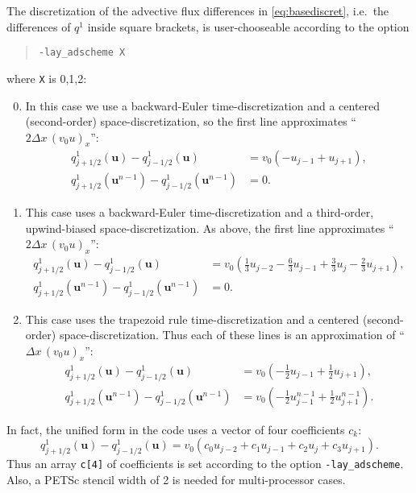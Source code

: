 \documentclass[11pt]{amsart}
\newcommand\bu{\mathbf{u}}
\begin{document}
The discretization of the advective flux differences in \eqref{eq:basediscret}, i.e.~the differences of $q^1$ inside square brackets, is user-chooseable according to the option
\begin{quote}
\verb|-lay_adscheme X|
\end{quote}
where \verb|X| is 0,1,2:
\medskip
\renewcommand{\labelenumi}{\texttt{X}$=$\arabic{enumi}: \quad}
\begin{enumerate}
\setcounter{enumi}{-1}
\item %
In this case we use a backward-Euler time-discretization and a centered (second-order) space-discretization, so the first line approximates ``$2 \Delta x\,(v_0 u)_x$'':
\begin{align*}
q^1_{j+1/2}(\bu) - q^1_{j-1/2}(\bu)             &= v_0 \left( - u_{j-1} + u_{j+1} \right), \\
q^1_{j+1/2}(\bu^{n-1}) - q^1_{j-1/2}(\bu^{n-1}) &= 0.
\end{align*}
\item %
This case uses a backward-Euler time-discretization and a third-order, upwind-biased space-discretization.  As above, the first line approximates ``$2 \Delta x\,(v_0 u)_x$'':
\begin{align*}
q^1_{j+1/2}(\bu) - q^1_{j-1/2}(\bu)             &= v_0 \left( \tfrac{1}{3} u_{j-2} - \tfrac{6}{3} u_{j-1} + \tfrac{3}{3} u_j - \tfrac{2}{3} u_{j+1} \right), \\
q^1_{j+1/2}(\bu^{n-1}) - q^1_{j-1/2}(\bu^{n-1}) &= 0.
\end{align*}
\item %
This case uses the trapezoid rule time-discretization and a centered (second-order) space-discretization.  Thus each of these lines is an approximation of ``$\Delta x\,(v_0 u)_x$'':
\begin{align*}
q^1_{j+1/2}(\bu) - q^1_{j-1/2}(\bu)             &= v_0 \left( - \tfrac{1}{2} u_{j-1} + \tfrac{1}{2} u_{j+1} \right), \\
q^1_{j+1/2}(\bu^{n-1}) - q^1_{j-1/2}(\bu^{n-1}) &= v_0 \left( - \tfrac{1}{2} u_{j-1}^{n-1} + \tfrac{1}{2} u_{j+1}^{n-1} \right).
\end{align*}
\end{enumerate}

\medskip
In fact, the unified form in the code uses a vector of four coefficients $c_k$:
\begin{equation}
   q^1_{j+1/2}(\bu) - q^1_{j-1/2}(\bu) = v_0 \left( c_0 u_{j-2} + c_1 u_{j-1} + c_2 u_j + c_3 u_{j+1} \right). \label{eq:dfluxunified}
\end{equation}
Thus an array \verb|c[4]| of coefficients is set according to the option \verb|-lay_adscheme|.  Also, a PETSc stencil width of 2 is needed for multi-processor cases.
\end{document}
